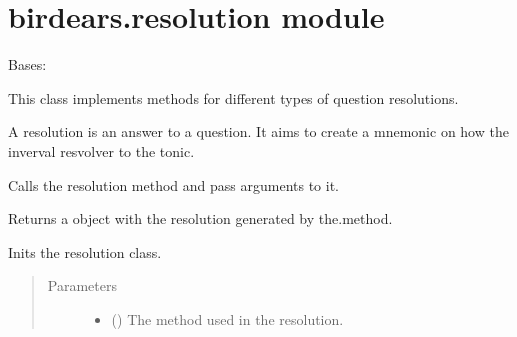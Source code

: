 \documentclass[letterpaper,10pt,english]{sphinxmanual}
\begin{document}
\section{birdears.resolution module}
\label{\detokenize{birdears:module-birdears.resolution}}\label{\detokenize{birdears:birdears-resolution-module}}

\begin{fulllineitems}
\label{\detokenize{birdears:birdears.resolution.Resolution}}
Bases: 

This class implements methods for different types of question
resolutions.

A resolution is an answer to a question. It aims to create a mnemonic on
how the inverval resvolver to the tonic.

\begin{fulllineitems}
\label{\detokenize{birdears:birdears.resolution.Resolution.__call__}}
Calls the resolution method and pass arguments to it.

Returns a  object with the resolution generated by
the.method.

\end{fulllineitems}


\begin{fulllineitems}
\label{\detokenize{birdears:birdears.resolution.Resolution.__init__}}
Inits the resolution class.
\begin{quote}\begin{description}
\item[{Parameters}] \leavevmode\begin{itemize}
\item {} 
 () \textendash{} The method used in the resolution.


\end{itemize}
\end{description}
\end{quote}
\end{fulllineitems}
\end{fulllineitems}
\end{document}
